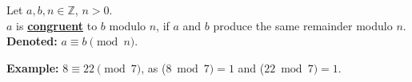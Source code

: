 \noindent
\begin{Def}[Congruence]

    \label{def:congruence}

    Let $a,b,n\in\mathbb{Z}$, $n>0$.\\

    \noindent
    $a$ is \underline{\textbf{congruent}} to $b$ modulo $n$, if $a$ and $b$ produce the same remainder
    modulo $n$.\\

    \noindent
    \textbf{Denoted:} $a\equiv b\pmod{n}$.
\end{Def}

\noindent
\textbf{Example:} $8\equiv22\pmod7$, as ($8\bmod7)=1$ and ($22\bmod7)=1$.\\






